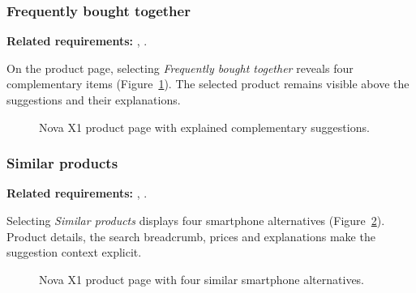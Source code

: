 \begin{samepage}
\subsubsection{Frequently bought together}
\label{sec:prototype-together-view}

\textbf{Related requirements:} , .

On the product page, selecting \emph{Frequently bought together} reveals four
complementary items (Figure~\ref{fig:prototype-together}). The selected product
remains visible above the suggestions and their explanations.

\nopagebreak[4]
\begin{figure}[H]
  \centering
  \caption{Nova X1 product page with explained complementary suggestions.}
  \label{fig:prototype-together}
\end{figure}
\end{samepage}

\begin{samepage}
\subsubsection{Similar products}
\label{sec:prototype-similar-view}

\textbf{Related requirements:} , .

Selecting \emph{Similar products} displays four smartphone alternatives
(Figure~\ref{fig:prototype-similar}). Product details, the search breadcrumb,
prices and explanations make the suggestion context explicit.

\nopagebreak[4]
\begin{figure}[H]
  \centering
  \caption{Nova X1 product page with four similar smartphone alternatives.}
  \label{fig:prototype-similar}
\end{figure}
\end{samepage}

